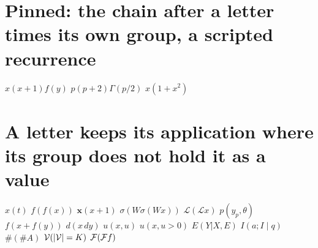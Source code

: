 \documentclass{article}
\begin{document}
\section{Pinned: the chain after a letter times its own group, a scripted recurrence}
$x(x+1)f(y)$ $p(p+2)\Gamma(p/2)$ $x(1+x^2)$

\section{A letter keeps its application where its group does not hold it as a value}
$x(t)$ $f(f(x))$ $\mathbf{x}(x+1)$ $\sigma(W\sigma(Wx))$ $\mathcal{L}(\mathcal{L}x)$ $p(y_p,\theta)$ $f(x+f(y))$
$d(x\,dy)$ $u(x,u)$ $u(x,u>0)$ $E(Y|X,E)$ $I(a;I\mid q)$ $\#(\#A)$ ${\cal V}(|{\cal V}|=K)$ ${\cal F}({\cal F}f)$
\end{document}

